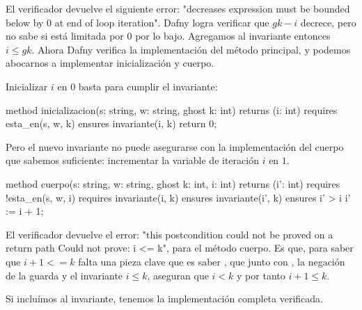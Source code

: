 \documentclass[12pt, a4paper, openany, fleqn]{book}
\begin{document}
    El verificador devuelve el siguiente error: "decreases expression must be bounded below by 0 at end of loop iteration". Dafny logra verificar que $gk -i$ decrece, pero no sabe si está limitada por 0 por lo bajo. Agregamos al invariante entonces $i \leq gk$. Ahora Dafny verifica la implementación del método principal, y podemos abocarnos a implementar inicialización y cuerpo.

    Inicializar $i$ en $0$ basta para cumplir el invariante:

    \begin{dafny}
method inicializacion(s: string, w: string, ghost k: int) returns (i: int)
  requires esta_en(s, w, k)
  ensures invariante(i, k)
{
  return 0;
}
    \end{dafny}

    Pero el nuevo invariante no puede asegurarse con la implementación del cuerpo que sabemos suficiente: incrementar la variable de iteración $i$ en $1$.

    \begin{dafny}
method cuerpo(s: string, w: string, ghost k: int, i: int) returns (i': int)
  requires !esta_en(s, w, i)
  requires invariante(i, k)
  ensures invariante(i', k)
  ensures i' > i
{
  i' := i + 1;
}
    \end{dafny}
    El verificador devuelve el error: "this postcondition could not be proved on a return path
    Could not prove: i <= k", para el método cuerpo.
    Es que, para saber que $i+1<=k$ falta una pieza clave que es saber , que junto con , la negación de la guarda y el invariante $i \leq k$, aseguran que $i < k$ y por tanto $i+1 \leq k$.

    Si incluímos  al invariante, tenemos la implementación completa verificada.

\end{document}

